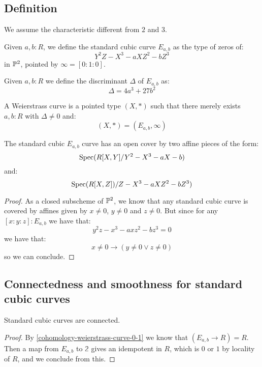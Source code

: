 \subsection{Definition}

We assume the characteristic different from $2$ and $3$.

\begin{definition}
Given $a,b:R$, we define the standard cubic curve $E_{a,b}$ as the type of zeros of:
\[Y^2Z - X^3 - a XZ^2 - b Z^3\]
in $\mathbb{P}^2$, pointed by $\infty = [0:1:0]$.
\end{definition}

\begin{definition}
Given $a,b:R$ we define the discriminant $\Delta$ of $E_{a,b}$ as:
\[\Delta = 4a^3 + 27 b^2\]
\end{definition}

\begin{definition}
A Weierstrass curve is a pointed type $(X,*)$ such that there merely exists $a,b:R$ with $\Delta\not=0$ and:
\[(X,*) = (E_{a,b},\infty)\]
\end{definition}

\begin{lemma}\label{standard-cover-cubic}
The standard cubic $E_{a,b}$ curve has an open cover by two affine pieces of the form:
\[\operatorname{Spec}(R[X,Y]/Y^2-X^3-aX-b)\]
and:
\[\operatorname{Spec}(R[X,Z])/Z-X^3-aXZ^2-bZ^3)\]
\end{lemma}

\begin{proof}
As a closed subscheme of $\mathbb{P}^2$, we know that any standard cubic curve is covered by affines given by $x\not=0$, $y\not=0$ and $z\not=0$. But since for any $[x:y:z]:E_{a,b}$ we have that:
\[y^2z - x^3 - a xz^2 - b z^3 = 0\]
we have that:
\[x\not=0 \to (y\not=0 \lor z\not=0)\]
so we can conclude.
\end{proof}

\subsection{Connectedness and smoothness for standard cubic curves}

\begin{lemma}
Standard cubic curves are connected.
\end{lemma}

\begin{proof}
By \cref{cohomology-weierstrass-curve-0-1} we know that $(E_{a,b}\to R) = R$. Then a map from $E_{a,b}$ to $\mathbb{2}$ gives an idempotent in $R$, which is $0$ or $1$ by locality of $R$, and we conclude from this.
\end{proof}

